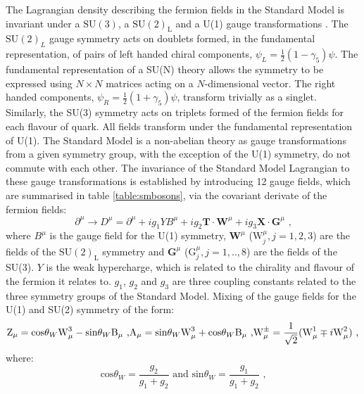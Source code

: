 The Lagrangian density describing the fermion fields in the Standard Model is invariant under a $\text{SU}(3)$, a $\text{SU}(2)_{\text{L}}$ and a U(1) gauge transformations .  The $\text{SU}(2)_{L}$ gauge symmetry acts on doublets formed, in the fundamental representation, of pairs of left handed chiral components, $\psi_{L} = \frac{1}{2}(1-\gamma_{5})\psi$.  The fundamental representation of a SU(N) theory allows the symmetry to be expressed using $N \times N$ matrices acting on a $N$-dimensional vector.  The right handed components, $\psi_{R} = \frac{1}{2}(1+\gamma_{5})\psi$, transform trivially as a singlet.  Similarly, the SU(3) symmetry acts on triplets formed of the fermion fields for each flavour of quark.  All fields transform under the fundamental representation of U(1).  The Standard Model is a non-abelian theory as gauge transformations from a given symmetry group, with the exception of the U(1) symmetry, do not commute with each other.  The invariance of the Standard Model Lagrangian to these gauge transformations is established by introducing 12 gauge fields, which are summarised in table \ref{table:smbosons}, via the covariant derivate of the fermion fields:
%
\begin{equation}
\partial^{\mu} \rightarrow D^{\mu} = \partial^{\mu} + ig_{1}YB^{\mu} + ig_{2} \textbf{T} \cdot \textbf{W}^{\mu} + ig_{3}\textbf{X} \cdot \textbf{G}^{\mu} \text{ ,}
\end{equation}
%
\noindent where $B^{\mu}$ is the gauge field for the U(1) symmetry, $\textbf{W}^{\mu}$ ($\text{W}^{\mu}_{j}, j =1,2,3$) are the fields of the $\text{SU}(2)_{\text{L}}$ symmetry and $\textbf{G}^{\mu}$ ($\text{G}^{\mu}_{j}, j =1,..,8$) are the fields of the SU(3).  $Y$ is the weak hypercharge, which is related to the chirality and flavour of the fermion it relates to.  $g_{1}$, $g_{2}$ and $g_{3}$ are three coupling constants related to the three symmetry groups of the Standard Model.  Mixing of the gauge fields for the U(1) and SU(2) symmetry of the form:
%
\begin{equation}
\text{Z}_{\mu} = \text{cos}{\theta_{W}} \text{W}^{3}_{\mu} - \text{sin}{\theta_{W}} \text{B}_{\mu} \text{ ,}\\
\text{A}_{\mu} = \text{sin}{\theta_{W}} \text{W}^{3}_{\mu} + \text{cos}{\theta_{W}} \text{B}_{\mu} \text{ ,}\\
\text{W}^{\pm}_{\mu} = \frac{1}{\sqrt{2}}(\text{W}^{1}_{\mu} \mp i \text{W}^{2}_{\mu}) \text{ ,}
\end{equation}
%
\noindent where:
%
\begin{equation}
\text{cos}{\theta_{W}} = \frac{g_{2}}{g_{1}+g_{2}} \text{ and } \text{sin}{\theta_{W}} = \frac{g_{1}}{g_{1}+g_{2}} \text{ ,}
\end{equation}

